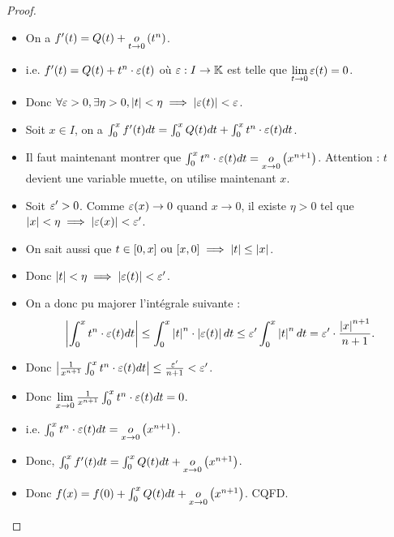 \documentclass[12pt, a4paper]{report}
\begin{document}
\begin{proof}
    \begin{itemize}
        \item On a $f'(t)=Q(t)+\underset{t\to0}{o}\left(t^n\right)$.

        \item i.e. $f'(t) = Q(t) + t^n \cdot \varepsilon(t)$ où $\varepsilon : I \to \mathbb{K}$ est telle que $\lim\limits_{t\to 0} \varepsilon(t) = 0$.

        \item Donc $\forall \varepsilon > 0, \exists \eta > 0, \left|t\right| < \eta \implies \left|\varepsilon(t)\right| < \varepsilon$.

        \item Soit $x\in I$, on a $\int_{0}^{x}f'(t)dt = \int_{0}^{x} Q(t) dt + \int_{0}^{x} t^n \cdot \varepsilon(t) dt$.

        \item Il faut maintenant montrer que $\int_{0}^{x} t^n \cdot \varepsilon(t) dt = \underset{x\to0}{o}\left(x^{n+1}\right)$. Attention : $t$ devient une variable muette, on utilise maintenant $x$.

        \item Soit $\varepsilon' > 0$. Comme $\varepsilon(x) \to 0$ quand $x \to 0$, il existe $\eta > 0$ tel que $\left|x\right| < \eta \implies \left|\varepsilon(x)\right| < \varepsilon'$.
        
        \item On sait aussi que $t\in[0,x] \text{ ou } [x,0] \implies \left|t\right| \le \left|x\right|$.
        
        \item Donc $\left|t\right|<\eta \implies \left|\varepsilon(t)\right| < \varepsilon'$.
        
        \item On a donc pu majorer l'intégrale suivante :
        $$\left|\int_{0}^{x} t^n \cdot \varepsilon(t) dt\right| \le \int_{0}^{x} \left|t\right|^n \cdot \left|\varepsilon(t)\right| dt \le \varepsilon' \int_{0}^{x} \left|t\right|^n dt = \varepsilon' \cdot \frac{\left|x\right|^{n+1}}{n+1}.$$

        \item Donc $\left|\frac{1}{x^{n+1}} \int_{0}^{x} t^n \cdot \varepsilon(t) dt\right| \le \frac{\varepsilon'}{n+1} < \varepsilon'$.
        
        \item Donc $\lim\limits_{x\to 0} \frac{1}{x^{n+1}} \int_{0}^{x} t^n \cdot \varepsilon(t) dt = 0$.
        
        \item i.e. $\int_{0}^{x} t^n \cdot \varepsilon(t) dt = \underset{x\to0}{o}\left(x^{n+1}\right)$.
        \item Donc, $\int_{0}^{x} f'(t) dt = \int_{0}^{x} Q(t) dt + \underset{x\to0}{o}\left(x^{n+1}\right)$.
        \item Donc $f(x) = f(0) + \int_{0}^{x} Q(t) dt + \underset{x\to0}{o}\left(x^{n+1}\right)$. CQFD.
    \end{itemize}
\end{proof}
\end{document}
